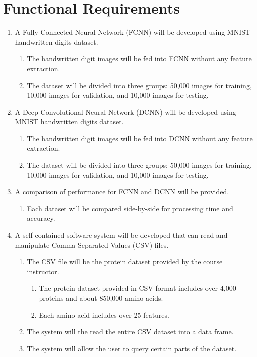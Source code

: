 \documentclass[12pt,letterpaper,oneside,reqno]{book}
\theoremstyle{plain}
\theoremstyle{definition}
\theoremstyle{plain}
\theoremstyle{remark}
\theoremstyle{plain}
\theoremstyle{definition}
\theoremstyle{plain}
\begin{document}
\section{Functional Requirements}
\begin{enumerate}
    \item A Fully Connected Neural Network (FCNN) will be developed using MNIST handwritten digits dataset.
    \begin{enumerate}
        \item The handwritten digit images will be fed into FCNN without any feature extraction.
        \item The dataset will be divided into three groups: 50,000 images for training, 10,000 images for validation, and 10,000 images for testing.
    \end{enumerate}

    \item A Deep Convolutional Neural Network (DCNN) will be developed using MNIST handwritten digits dataset.
    \begin{enumerate}
        \item The handwritten digit images will be fed into DCNN without any feature extraction.
        \item The dataset will be divided into three groups: 50,000 images for training, 10,000 images for validation, and 10,000 images for testing.
    \end{enumerate}

    \item A comparison of performance for FCNN and DCNN will be provided.
    \begin{enumerate}
        \item Each dataset will be compared side-by-side for processing time and accuracy.
    \end{enumerate}
    
    \item A self-contained software system will be developed that can read and manipulate Comma Separated Values (CSV) files.
    \begin{enumerate}
        \item The CSV file will be the protein dataset provided by the course instructor.
        \begin{enumerate}
            \item The protein dataset provided in CSV format includes over 4,000 proteins and about 850,000 amino acids.
            \item Each amino acid includes over 25 features.
        \end{enumerate}
        \item The system will the read the entire CSV dataset into a data frame.
        \item The system will allow the user to query certain parts of the dataset.
    \end{enumerate}
    

\end{enumerate}
\end{document}

